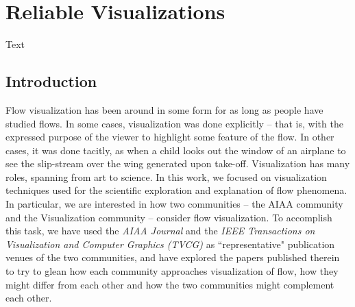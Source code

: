 \chapter{Reliable Visualizations}
\label{chap:aiaa}

Text

\section{Introduction}

Flow visualization has been around in some form for as long as people have studied flows.  In some
cases, visualization was done explicitly -- that is, with the expressed purpose of the viewer to highlight
some feature of the flow.  In other cases, it was done tacitly, as when a child looks out the window
of an airplane to see the slip-stream over the wing generated upon take-off.  Visualization has
many roles, spanning from art to science.  In this work, we focused on visualization techniques
used for the scientific exploration and explanation of flow phenomena.  In particular, we are interested
in how two communities -- the AIAA community and the Visualization community -- consider
flow visualization.  To accomplish this task, we have used the {\em AIAA Journal} and the
{\em IEEE Transactions on Visualization and Computer Graphics (TVCG)} as ``representative" publication
venues of the two communities, and have explored the papers published therein to try to 
glean how each community approaches visualization of flow, how they might differ from each other 
and how the two communities might complement each other. 

